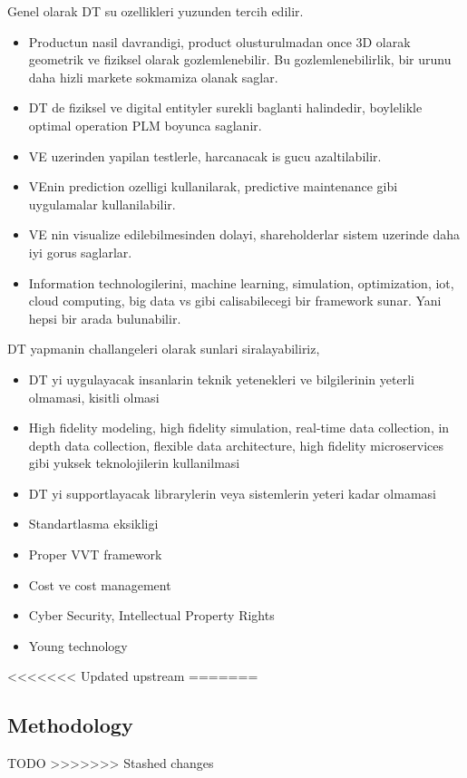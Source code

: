 \documentclass[9pt,conference]{IEEEtran}
\begin{document}
    Genel olarak DT su ozellikleri yuzunden tercih edilir.
    \begin{itemize}
        \item Productun nasil davrandigi, product olusturulmadan once  3D olarak geometrik ve fiziksel olarak gozlemlenebilir. Bu gozlemlenebilirlik, bir urunu daha hizli markete sokmamiza olanak saglar. 
        \item  DT de fiziksel ve digital entityler surekli baglanti halindedir, boylelikle optimal operation PLM boyunca saglanir.
        \item VE uzerinden yapilan testlerle, harcanacak is gucu azaltilabilir. 
        \item VEnin prediction ozelligi kullanilarak, predictive maintenance gibi uygulamalar kullanilabilir.
        \item  VE nin visualize edilebilmesinden dolayi, shareholderlar sistem uzerinde daha iyi gorus saglarlar. 
        \item Information technologilerini, machine learning, simulation, optimization, iot, cloud computing, big data vs gibi  calisabilecegi bir framework sunar. Yani hepsi bir arada bulunabilir.
    \end{itemize}

    DT yapmanin challangeleri olarak sunlari siralayabiliriz,
    \begin{itemize}
        \item DT yi uygulayacak insanlarin teknik yetenekleri ve bilgilerinin yeterli olmamasi, kisitli olmasi
        \item High fidelity modeling, high fidelity simulation, real-time data collection, in depth data collection, flexible data architecture, high fidelity microservices gibi yuksek teknolojilerin kullanilmasi
        \item DT yi supportlayacak librarylerin veya sistemlerin yeteri kadar olmamasi
        \item Standartlasma eksikligi
        \item Proper VVT framework 
        \item Cost ve cost management 
        \item Cyber Security, Intellectual Property Rights
        \item Young technology
    \end{itemize}


<<<<<<< Updated upstream
=======
    \subsection{Methodology}
    TODO
>>>>>>> Stashed changes
\end{document}
